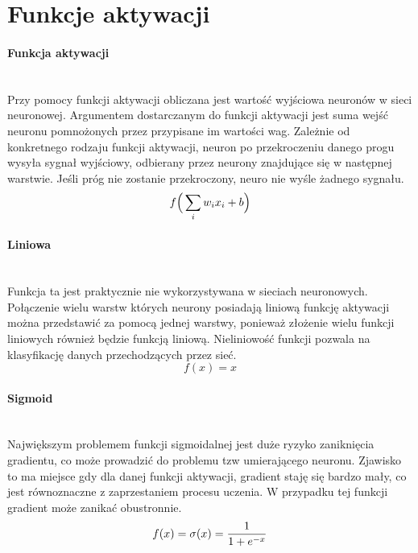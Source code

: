 \section{Funkcje aktywacji}
\paragraph{Funkcja aktywacji} \mbox{}\\
Przy pomocy funkcji aktywacji obliczana jest wartość wyjściowa neuronów w sieci
neuronowej. Argumentem dostarczanym do funkcji aktywacji jest suma wejść neuronu
pomnożonych przez przypisane im wartości wag. Zależnie od konkretnego rodzaju funkcji
aktywacji, neuron po przekroczeniu danego progu wysyła sygnał wyjściowy, odbierany
przez neurony znajdujące się w następnej warstwie. Jeśli próg nie zostanie przekroczony,
neuro nie wyśle żadnego sygnału.
\begin{equation}
f\Big(\sum_{i}w_{i}x_{i} + b\Big) \\
\end{equation}

\paragraph{Liniowa} \mbox{}\\
Funkcja ta jest praktycznie nie wykorzystywana w sieciach neuronowych. Połączenie
wielu warstw których neurony posiadają liniową funkcję aktywacji można przedstawić
za pomocą jednej warstwy,  ponieważ złożenie wielu funkcji liniowych również będzie
funkcją liniową. Nieliniowość funkcji pozwala na klasyfikację danych przechodzących
przez sieć.
\begin{equation}
f(x) = x
\end{equation}


\paragraph{Sigmoid} \mbox{}\\
Największym problemem funkcji sigmoidalnej jest duże ryzyko zaniknięcia gradientu,
co może prowadzić do problemu tzw umierającego neuronu. Zjawisko to ma miejsce
gdy dla danej funkcji aktywacji, gradient staję się bardzo mały, co jest równoznaczne
z zaprzestaniem procesu uczenia. W przypadku tej funkcji gradient może zanikać obustronnie.
\begin{equation}
f(x) = \sigma(x) = \frac{1}{1 + e^{-x}} \\
\end{equation}

